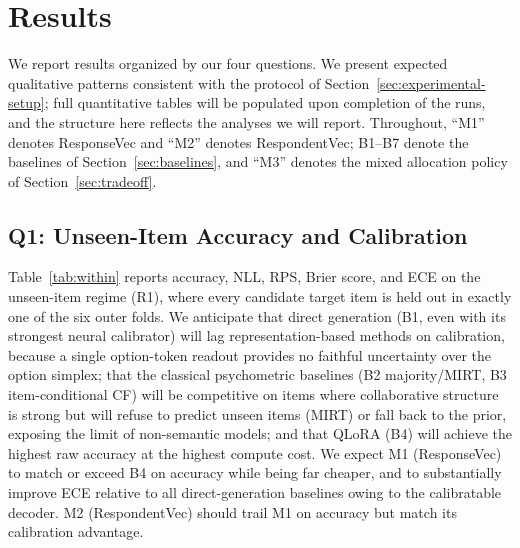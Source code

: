 \section{Results}
\label{sec:results}

We report results organized by our four questions. We present expected qualitative patterns consistent with the protocol of Section~\ref{sec:experimental-setup}; full quantitative tables will be populated upon completion of the runs, and the structure here reflects the analyses we will report. Throughout, ``M1'' denotes ResponseVec and ``M2'' denotes RespondentVec; B1--B7 denote the baselines of Section~\ref{sec:baselines}, and ``M3'' denotes the mixed allocation policy of Section~\ref{sec:tradeoff}.

\subsection{Q1: Unseen-Item Accuracy and Calibration}
\label{sec:results-q1}

Table~\ref{tab:within} reports accuracy, NLL, RPS, Brier score, and ECE on the unseen-item regime (R1), where every candidate target item is held out in exactly one of the six outer folds. We anticipate that direct generation (B1, even with its strongest neural calibrator) will lag representation-based methods on calibration, because a single option-token readout provides no faithful uncertainty over the option simplex; that the classical psychometric baselines (B2 majority/MIRT, B3 item-conditional CF) will be competitive on items where collaborative structure is strong but will refuse to predict unseen items (MIRT) or fall back to the prior, exposing the limit of non-semantic models; and that QLoRA (B4) will achieve the highest raw accuracy at the highest compute cost. We expect M1 (ResponseVec) to match or exceed B4 on accuracy while being far cheaper, and to substantially improve ECE relative to all direct-generation baselines owing to the calibratable decoder. M2 (RespondentVec) should trail M1 on accuracy but match its calibration advantage.


